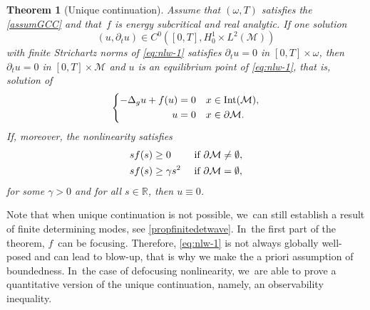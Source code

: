\documentclass[10pt]{amsart}
\newtheorem{theorem}{Theorem}[section]
\theoremstyle{definition}
\let\mc\mathcal
\newcommand{\M}{\mc{M}}
\newcommand{\R}{\mathbb{R}}
\begin{document}
\begin{theorem}[Unique continuation]\label{thm:unique-continuation-nlw}
Assume that $(\omega, T)$ satisfies the \ref{assumGCC} and that~$f$ is energy subcritical and real analytic. If one solution
\[
(u,\partial_t u)\in C^0([0, T], H^1_0\times L^2(\M))
\]
with finite Strichartz norms of \eqref{eq:nlw-1} satisfies $\partial_t u=0$ in $[0, T]\times \omega$, then $\partial_t u=0$ in $[0, T]\times \M$ and $u$ is an equilibrium point of \eqref{eq:nlw-1}, that is, solution of
\begin{align}\label{thm:eq:nlw-equilibrium}
\left\{\begin{aligned}
-\Delta_g u+f(u)&=0 &x&\in\textnormal{Int}(\M),\\
u&=0 &x&\in \partial\M.
\end{aligned}\right.
\end{align}
If, moreover, the nonlinearity satisfies
\begin{align}
\label{defdefocusing}
sf(s)&\geq 0\quad\quad \textnormal{ if }\partial \M\neq \emptyset,\\
\nonumber sf(s)&\geq \gamma s^2\quad \textnormal{ if }\partial \M= \emptyset,
\end{align}
for some $\gamma>0$ and for all $s\in \R$, then $u\equiv 0$.
\end{theorem}


Note that when unique continuation is not possible, we~can still establish a result of finite determining modes, see \cref{propfinitedetwave}. In~the first part of the theorem, $f$~can be focusing. Therefore, \eqref{eq:nlw-1} is not always globally well-posed and can lead to blow-up, that is why we make the a priori assumption of boundedness. In~the case of defocusing nonlinearity, we~are able to prove a quantitative version of the unique continuation, namely, an observability inequality.
\end{document}
